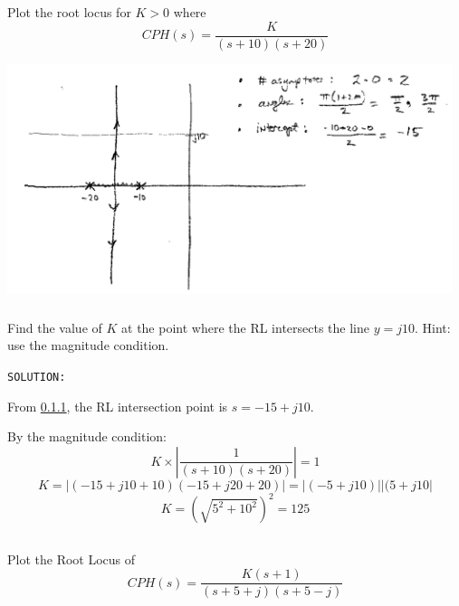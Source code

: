 \documentclass{article}	%
\begin{document}
\subsection{}

\subsubsection{}
\label{xx1} Plot the root locus for $K>0$ where
\[
CPH(s) = \frac{K}{(s+10)(s+20)}
\]

\includegraphics[width=13cm]{00551a.png}	%





\subsubsection{}  Find the value of $K$ at the point where the RL intersects the line $y=j10$.  Hint: use the magnitude condition.

 {\tt SOLUTION: }	%

From \ref{xx1}, the RL intersection point is $s=-15+j10$.

By the magnitude condition:
\[
K\times \left | \frac{1}{(s+10)(s+20)} \right | = 1
\]
\[
K = |(-15+j10+10)(-15+j20+20)| = |(-5+j10)||(5+j10|
\]
\[
K = (\sqrt{5^2+10^2} )^2 = 125
\]



\subsection{}  Plot the Root Locus of
\[
CPH(s) = \frac{K(s+1)}{(s+5+j)(s+5-j)}
\]
\end{document}
